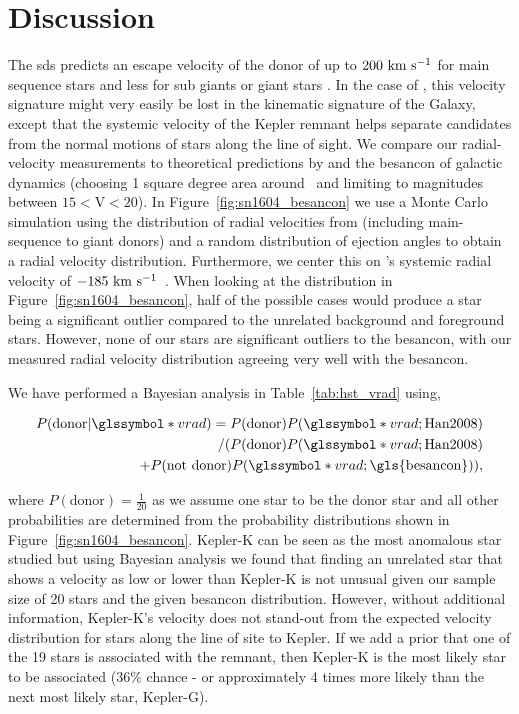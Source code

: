 \documentclass[preprint2]{aastex}
\begin{document}




\section{Discussion}
\label{sec:discussion}

The \gls{sds} predicts an escape velocity of the donor of up to $200~\textrm{km}~\textrm{s}^{-1}$ for main sequence stars and less for sub giants or giant stars \citep[down to roughly 60~\,\kms;][]{2008ApJ...677L.109H}. In the case of , this velocity signature might very easily be lost in the kinematic signature of the Galaxy, except that the systemic velocity of the Kepler remnant helps separate candidates from the normal motions of stars along the line of sight. We compare our radial-velocity measurements to theoretical predictions by \citet{2008ApJ...677L.109H} and the \gls{besancon} of galactic dynamics (choosing 1 square degree area around \ and limiting to magnitudes between $15<$V$<20$). In Figure~\ref{fig:sn1604_besancon} we use a Monte Carlo simulation using the distribution of radial velocities from \citet{2008ApJ...677L.109H} (including main-sequence to giant donors) and a random distribution of ejection angles to obtain a radial velocity distribution. Furthermore, we center this on 's systemic radial velocity of $-185~\textrm{km}~\textrm{s}^{-1}$\ \citep{2003A&A...407..249S}. When looking at the \citet{2008ApJ...677L.109H} distribution in Figure~\ref{fig:sn1604_besancon}, half of the possible cases would produce a star being a significant outlier compared to the unrelated background and foreground stars. However, none of our stars are significant outliers to the \gls{besancon}, with our measured radial velocity distribution agreeing very well with the \gls{besancon}. 


We have performed a Bayesian analysis in Table~\ref{tab:hst_vrad} using,

\begin{align}
P(\textrm{donor}|\vrad) = P(\textrm{donor})P(\vrad;\textrm{Han2008})\nonumber\\
 / (P(\textrm{donor})P(\vrad;\textrm{Han2008})\nonumber \\
+ P(\textrm{not donor})P(\vrad;\textrm{\gls{besancon}}))\nonumber,
\end{align}

where $P(\textrm{donor}) = \frac{1}{20}$ as we assume one star to be the donor star and all other probabilities are determined from the probability distributions shown in Figure~\ref{fig:sn1604_besancon}. Kepler-K can be seen as the most anomalous star studied but using Bayesian analysis we found that finding an unrelated star that shows a velocity as low or lower than  Kepler-K is not unusual given our sample size of 20 stars and the given \gls{besancon} distribution. However, without additional information, Kepler-K's velocity does not stand-out from the expected velocity distribution for stars along the line of site to Kepler. If we add a prior that one of the 19 stars is associated with the remnant, then Kepler-K is the most likely star to be associated (36\% chance - or approximately 4 times more likely than the next most likely star, Kepler-G).
\end{document}
